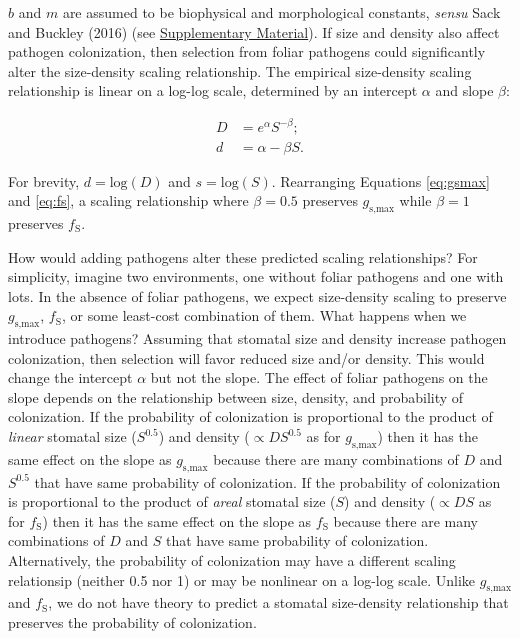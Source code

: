 \documentclass[utf8]{frontiersSCNS}
\newcommand{\fs}{$f_\text{S}$}
\newcommand{\gsmax}{$g_\text{s,max}$}
\begin{document}
\(b\) and \(m\) are assumed to be biophysical and morphological
constants, \emph{sensu} Sack and Buckley (2016) (see
\protect\hyperlink{supplementary-material}{Supplementary Material}). If
size and density also affect pathogen colonization, then selection from
foliar pathogens could significantly alter the size-density scaling
relationship. The empirical size-density scaling relationship is linear
on a log-log scale, determined by an intercept \(\alpha\) and slope
\(\beta\):

\begin{align}
  D & = e ^ \alpha S ^ {-\beta}; \\
  d & = \alpha - \beta S.
\end{align}

For brevity, \(d = \text{log}(D)\) and \(s = \text{log}(S)\).
Rearranging Equations \ref{eq:gsmax} and \ref{eq:fs}, a scaling
relationship where \(\beta = 0.5\) preserves \gsmax{} while
\(\beta = 1\) preserves \fs.

How would adding pathogens alter these predicted scaling relationships?
For simplicity, imagine two environments, one without foliar pathogens
and one with lots. In the absence of foliar pathogens, we expect
size-density scaling to preserve \gsmax{}, \fs{}, or some least-cost
combination of them. What happens when we introduce pathogens? Assuming
that stomatal size and density increase pathogen colonization, then
selection will favor reduced size and/or density. This would change the
intercept \(\alpha\) but not the slope. The effect of foliar pathogens
on the slope depends on the relationship between size, density, and
probability of colonization. If the probability of colonization is
proportional to the product of \emph{linear} stomatal size
(\(S ^ {0.5}\)) and density (\(\propto D S ^ {0.5}\) as for \gsmax) then
it has the same effect on the slope as \gsmax{} because there are many
combinations of \(D\) and \(S ^ {0.5}\) that have same probability of
colonization. If the probability of colonization is proportional to the
product of \emph{areal} stomatal size (\(S\)) and density
(\(\propto D S\) as for \fs) then it has the same effect on the slope as
\fs{} because there are many combinations of \(D\) and \(S\) that have
same probability of colonization. Alternatively, the probability of
colonization may have a different scaling relationsip (neither 0.5 nor
1) or may be nonlinear on a log-log scale. Unlike \gsmax{} and \fs{}, we
do not have theory to predict a stomatal size-density relationship that
preserves the probability of colonization.
\end{document}
